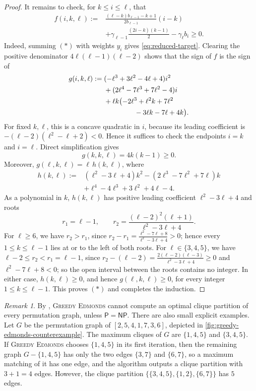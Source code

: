 \documentclass[a4paper,fleqn]{cas-sc}
\theoremstyle{remark}
\newtheorem{rem}[thm]{Remark}
\theoremstyle{plain}
\newcommand{\edmonds}{{\textsc{Greedy Edmonds}}}
\begin{document}
\begin{proof}
It remains to check, for $k\leq i\leq\ell$, that
\begin{equation*}
\begin{split}
f(i,k,\ell):={}&
\frac{(\ell-k)b_{\ell-1}-k+1}{2b_{\ell-1}}(i-k)\\
&+\gamma_{\ell-1}\frac{(2i-k)(k-1)}{2}
-\gamma_\ell b_i
\geq 0.
\end{split}
\tag{$*$}
\end{equation*}
Indeed, summing $(*)$ with weights $y_i$ gives
\eqref{eq:reduced-target}. Clearing the positive denominator
$4\ell(\ell-1)(\ell-2)$ shows that the sign of $f$ is the sign of
\begin{align*}
g(i,k,\ell):={}&
(-\ell^3+3\ell^2-4\ell+4)i^2\\
&+(2\ell^4-7\ell^3+7\ell^2-4)i\\
&+\ell k\bigl(-2\ell^3+\ell^2k+7\ell^2\\
&\hspace{4.4em}{}-3\ell k-7\ell+4k\bigr).
\end{align*}
For fixed $k,\ell$, this is a concave quadratic in $i$, because its
leading coefficient is
$-(\ell-2)(\ell^2-\ell+2)<0$. Hence it suffices to check the
endpoints $i=k$ and $i=\ell$. Direct simplification gives
\[
   g(k,k,\ell)=4k(k-1)\geq 0.
\]
Moreover, $g(\ell,k,\ell)=\ell\,h(k,\ell)$, where
\[
\begin{split}
h(k,\ell):={}&(\ell^2-3\ell+4)k^2-(2\ell^3-7\ell^2+7\ell)k\\
&+\ell^4-4\ell^3+3\ell^2+4\ell-4.
\end{split}
\]
As a polynomial in $k$, $h(k,\ell)$ has positive leading
coefficient $\ell^2-3\ell+4$ and roots
\[
   r_1=\ell-1,\qquad
   r_2=\frac{(\ell-2)^2(\ell+1)}{\ell^2-3\ell+4}.
\]
For $\ell\geq 6$, we have $r_2>r_1$, since
$r_2-r_1=\frac{\ell^2-7\ell+8}{\ell^2-3\ell+4}>0$; hence every
$1\leq k\leq\ell-1$ lies at or to the left of both roots. For
$\ell\in\{3,4,5\}$, we have
$\ell-2\leq r_2<r_1=\ell-1$, since
$r_2-(\ell-2)=\frac{2(\ell-2)(\ell-3)}{\ell^2-3\ell+4}\geq 0$ and
$\ell^2-7\ell+8<0$; so the open interval between the roots
contains no integer. In either case, $h(k,\ell)\geq 0$, and hence
$g(\ell,k,\ell)\geq 0$, for every integer
$1\leq k\leq\ell-1$. This proves $(*)$ and completes the induction.
\end{proof}

\begin{rem}
By , \edmonds{} cannot compute an optimal clique partition of every permutation graph, unless $\mathsf{P}=\mathsf{NP}$.  There are also small explicit examples.  Let $G$ be the permutation graph of $[2,5,4,1,7,3,6]$, depicted in \cref{fig:greedy-edmonds-counterexample}. The maximum cliques of $G$ are $\{1,4,5\}$ and $\{3,4,5\}$.  If \edmonds{} chooses $\{1,4,5\}$ in its first iteration, then the remaining graph $G-\{1,4,5\}$ has only the two edges $\{3,7\}$ and $\{6,7\}$, so a maximum matching of it has one edge, and the algorithm outputs a clique partition with $3+1=4$ edges.  However, the clique partition $\{\{3,4,5\},\{1,2\},\{6,7\}\}$ has $5$ edges.
\end{rem}
\end{document}
